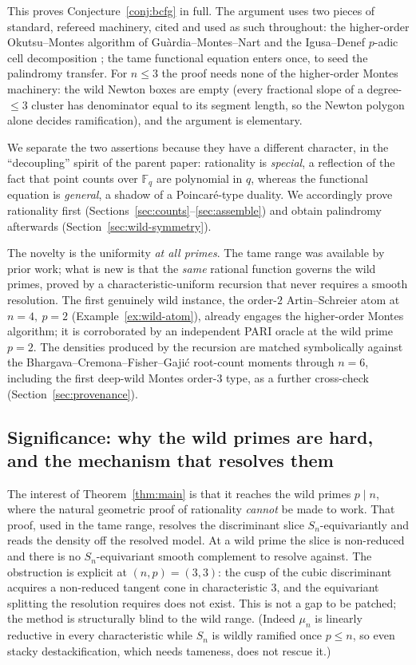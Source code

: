 \documentclass[pdflatex,sn-mathphys-num]{sn-jnl}%
\newcommand{\bbF}{\mathbb{F}}
\theoremstyle{plain}
\theoremstyle{definition}
\theoremstyle{remark}
\numberwithin{equation}{section}
\begin{document}
This proves Conjecture~\ref{conj:bcfg} in full. The argument uses two pieces of
standard, refereed machinery, cited and used as such throughout: the higher-order
Okutsu--Montes algorithm of Gu\`ardia--Montes--Nart \cite{gmn2012} and the
Igusa--Denef $p$-adic cell decomposition \cite{denef1991functional,igusa2000introduction};
the tame functional equation \cite{del_corso_dvornicich_2000,john,caruso2022zeroes}
enters once, to seed the palindromy transfer. For $n\le3$ the proof needs none of
the higher-order Montes machinery: the wild Newton boxes are empty (every fractional
slope of a degree-$\le3$ cluster has denominator equal to its segment length, so
the Newton polygon alone decides ramification), and the argument is elementary.

We separate the two assertions because they have a different character, in the
``decoupling'' spirit of the parent paper: rationality is \emph{special}, a
reflection of the fact that point counts over $\bbF_{q}$ are polynomial in $q$,
whereas the functional equation is \emph{general}, a shadow of a Poincar\'e-type
duality. We accordingly prove rationality first (Sections~\ref{sec:counts}--\ref{sec:assemble})
and obtain palindromy afterwards (Section~\ref{sec:wild-symmetry}).

The novelty is the uniformity \emph{at all primes}. The tame range was available
by prior work; what is new is that the \emph{same} rational function governs the
wild primes, proved by a characteristic-uniform recursion that never requires a
smooth resolution. The first genuinely wild instance, the order-$2$
Artin--Schreier atom at $n=4,\ p=2$ (Example~\ref{ex:wild-atom}), already engages
the higher-order Montes algorithm; it is corroborated by an independent PARI oracle
at the wild prime $p=2$. The densities produced by the recursion are matched
symbolically against the Bhargava--Cremona--Fisher--Gaji\'c root-count moments
through $n=6$, including the first deep-wild Montes order-$3$ type, as a further
cross-check (Section~\ref{sec:provenance}).

\subsection{Significance: why the wild primes are hard, and the mechanism that resolves them}\label{sec:significance}

The interest of Theorem~\ref{thm:main} is that it reaches the wild primes
$p\mid n$, where the natural geometric proof of rationality \emph{cannot} be
made to work. That proof, used in the tame range, resolves the discriminant slice
$S_{n}$-equivariantly and reads the density off the resolved model. At a wild prime
the slice is non-reduced and there is no $S_{n}$-equivariant smooth complement to
resolve against. The obstruction is explicit at $(n,p)=(3,3)$: the cusp of the
cubic discriminant acquires a non-reduced tangent cone in characteristic $3$, and
the equivariant splitting the resolution requires does not exist. This is not a gap
to be patched; the method is structurally blind to the wild range. (Indeed
$\mu_{n}$ is linearly reductive in every characteristic while $S_{n}$ is wildly
ramified once $p\le n$, so even stacky destackification, which needs tameness, does
not rescue it.)
\end{document}
